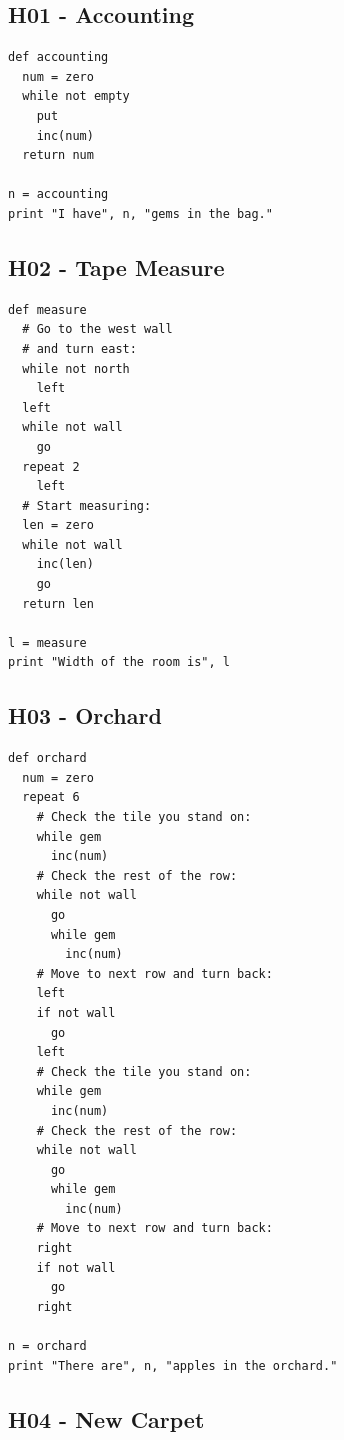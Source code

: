 \documentclass[article,A4,12pt]{llncs}
\begin{document}
\subsection{H01 - Accounting}

\begin{verbatim}
def accounting
  num = zero
  while not empty
    put
    inc(num)
  return num

n = accounting
print "I have", n, "gems in the bag."
\end{verbatim}


\subsection{H02 - Tape Measure}

\begin{verbatim}
def measure
  # Go to the west wall
  # and turn east:
  while not north
    left
  left
  while not wall
    go
  repeat 2
    left
  # Start measuring:
  len = zero
  while not wall
    inc(len)
    go
  return len
  
l = measure
print "Width of the room is", l
\end{verbatim}


\subsection{H03 - Orchard}

\begin{verbatim}
def orchard
  num = zero
  repeat 6
    # Check the tile you stand on:
    while gem
      inc(num)
    # Check the rest of the row:
    while not wall
      go
      while gem
        inc(num)
    # Move to next row and turn back:
    left
    if not wall
      go
    left
    # Check the tile you stand on:
    while gem
      inc(num)
    # Check the rest of the row:
    while not wall
      go
      while gem
        inc(num)
    # Move to next row and turn back:
    right
    if not wall
      go
    right

n = orchard
print "There are", n, "apples in the orchard."
\end{verbatim}


\subsection{H04 - New Carpet}
\end{document}
